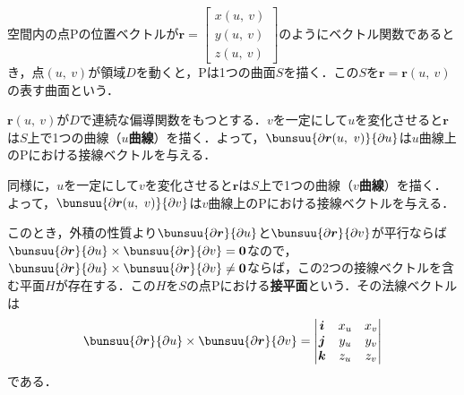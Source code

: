 空間内の点$\mathrm{P}$の位置ベクトルが$\bm{r} =
\begin{bmatrix}
	x(u,\ v)\\ y(u,\ v)\\ z(u,\ v)
\end{bmatrix}
$のようにベクトル関数であるとき，点$(u,\ v)$が領域$D$を動くと，$\mathrm{P}$は1つの曲面$S$を描く．この$S$を$\bm{r} = \bm{r}(u,\ v)$の表す曲面という．

$\bm{r}(u,\ v)$が$D$で連続な偏導関数をもつとする．$v$を一定にして$u$を変化させると$\bm{r}$は$S$上で1つの曲線（\textbf{$u$曲線}）を描く．よって，$\bunsuu{\partial \bm{r}(u,\ v)}{\partial u}$は$u$曲線上の$\mathrm{P}$における接線ベクトルを与える．

同様に，$u$を一定にして$v$を変化させると$\bm{r}$は$S$上で1つの曲線（\textbf{$v$曲線}）を描く．よって，$\bunsuu{\partial \bm{r}(u,\ v)}{\partial v}$は$v$曲線上の$\mathrm{P}$における接線ベクトルを与える．

このとき，外積の性質より$\bunsuu{\partial \bm{r}}{\partial u}$と$\bunsuu{\partial \bm{r}}{\partial v}$が平行ならば$\bunsuu{\partial \bm{r}}{\partial u} \times \bunsuu{\partial \bm{r}}{\partial v} = \bm{0}$なので，$\bunsuu{\partial \bm{r}}{\partial u} \times \bunsuu{\partial \bm{r}}{\partial v} \ne \bm{0}$ならば，この2つの接線ベクトルを含む平面$H$が存在する．この$H$を$S$の点$\mathrm{P}$における\textbf{接平面}という．その法線ベクトルは
\begin{equation}
	\bunsuu{\partial \bm{r}}{\partial u} \times \bunsuu{\partial \bm{r}}{\partial v} =
	\begin{vmatrix}
		\bm{i} & x_u & x_v\\
		\bm{j} & y_u & y_v\\
		\bm{k} & z_u & z_v
	\end{vmatrix}
\end{equation}
である．

